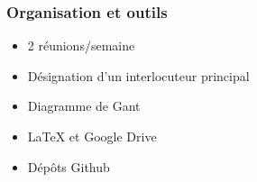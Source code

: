 \begin{frame}
	\frametitle{Organisation et outils}
	\begin{itemize}
		\item 2 réunions/semaine
	\end{itemize}
	\begin{itemize}
		\item Désignation d'un interlocuteur principal
	\end{itemize}
	\begin{itemize}
		\item Diagramme de Gant
	\end{itemize}
	\begin{itemize}
		\item LaTeX et Google Drive
	\end{itemize}
	\begin{itemize}
		\item Dépôts Github
	\end{itemize}
\end{frame}

